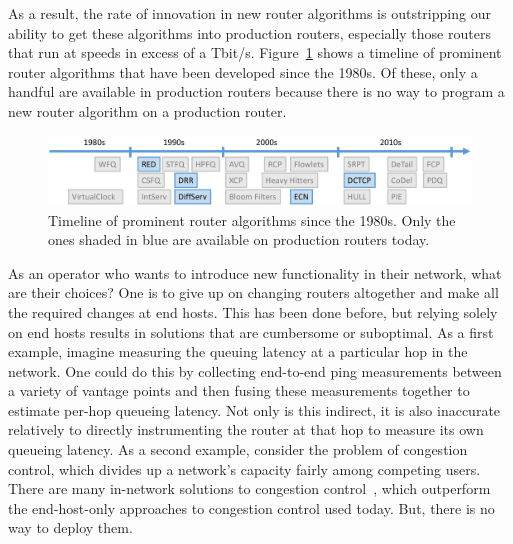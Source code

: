 As a result, the rate of innovation in new router algorithms is outstripping
our ability to get these algorithms into production routers, especially those
routers that run at speeds in excess of a Tbit/s.
Figure~\ref{fig:router_algos} shows a timeline of prominent router algorithms
that have been developed since the 1980s. Of these, only a handful are
available in production routers because there is no way to program a new router
algorithm on a production router.

\begin{figure}
\centering
\includegraphics[width=\columnwidth]{router_alg_timeline.pdf}
\caption{Timeline of prominent router algorithms since the 1980s. Only the ones shaded in blue are available on production routers today.}
\label{fig:router_algos}
\end{figure}

As an operator who wants to introduce new functionality in their network, what
are their choices? One is to give up on changing routers altogether and make
all the required changes at end hosts. This has been done before, but relying
solely on end hosts results in solutions that are cumbersome or suboptimal. As
a first example, imagine measuring the queuing latency at a particular hop in
the network. One could do this by collecting end-to-end ping measurements
between a variety of vantage points and then fusing these measurements together
to estimate per-hop queueing latency. Not only is this indirect, it is also
inaccurate relatively to directly instrumenting the router at that hop to
measure its own queueing latency. As a second example, consider the problem of
congestion control, which divides up a network's capacity fairly among competing
users. There are many in-network solutions to congestion control~\cite{xcp,
rcp}, which outperform the end-host-only approaches to congestion control used
today. But, there is no way to deploy them.


